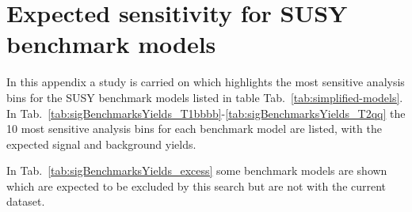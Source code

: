 \section{Expected sensitivity for SUSY benchmark models \label{app:sensitivity-benchmarks}}
In this appendix a study is carried on which highlights the most sensitive analysis bins for the SUSY 
benchmark models listed in table Tab.~\ref{tab:simplified-models}. \\
In Tab.~\ref{tab:sigBenchmarksYields_T1bbbb}-\ref{tab:sigBenchmarksYields_T2qq} the 10 most sensitive analysis bins 
for each benchmark model are listed, with the expected signal and background yields.

In Tab.~\ref{tab:sigBenchmarksYields_excess} some benchmark models are shown which 
are expected to be excluded by this search but are not with the current dataset. 

